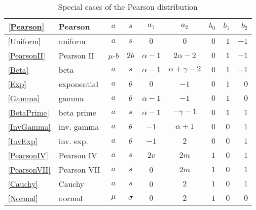 \begin{table*}[tb]
\begin{center}
\caption[Pearson distribution -- Special cases]{Special cases of the Pearson distribution}
\label{PearsonTable2}
{\renewcommand{\arraystretch}{1.25} 
\begin{tabular}{llccccrrr}
\\
\eqref{Pearson}  & Pearson & $a$ & $s$ & $a_1$ & $a_2$  & $b_0$ & $b_1$ & $b_2$ \\
\hline
\eqref{Uniform} 	& uniform 		&  $a$  &  $s$  &  $0$  &  $0$    &     $0$    & $1$ & $-1$  \checked\\
\eqref{PearsonII} 	& Pearson II 	&  $\mu$-$b$  &  $2b$  &  $\alpha-1$  &  $2\alpha-2$    &    $0$   & $1$ &$-1$ \checked\\
\eqref{Beta}     		& {beta} 		&  $a$  &  $s$  &  $\alpha-1$  &  $\alpha+\gamma-2$  &  $0$    &    $1$    &  $-1$  \checked \\
\eqref{Exp} 		& exponential 	&  $a$  &  $\theta$  &  $0$  &  $-1$    &    $0$    & $1$ & $0$ \checked \\
\eqref{Gamma} 	& gamma 		&  $a$  &  $\theta$  &  $\alpha-1$  &  $-1$    &    $0$    & $1$ & $0$ \checked \\
\eqref{BetaPrime} 	& {beta prime} 	&  $a$  &  $s$  &  $\alpha-1$  &  $-\gamma-1$  &  $0$    &    $1$    &  $1$\\
\eqref{InvGamma} 	& inv. gamma 	&  $a$  &  $\theta$  &  $-1$  &  $\alpha+1$  &      $0$    & $0$ & $1$ \checked \\
\eqref{InvExp} 		& inv. exp.&$a$ &  $\theta$  &  $-1$  &  $2$    &     $0$    & $0$ & $1$ \checked \\
\eqref{PearsonIV} 	& {Pearson IV} 	&  $a$  &  $s$  &  $2v$  &  $2m$  &  $1$    &    $0$    & $1$\\
\eqref{PearsonVII} 	& Pearson VII 	&  $a$  &  $s$  &  0  &  $2m$  &  $1$    &    $0$    & $1$ \checked\\
\eqref{Cauchy} 	& Cauchy 		&  $a$  &  $s$  &  0  &  $2$  &    $1$    &    $0$    & $1$  \checked \\
\eqref{Normal} 		& normal 		&$\mu$&  $\sigma$  &  $0$  &  $2$    &    $1$    &    $0$    & $0$ \\
\end{tabular} 
}
\end{center}
\end{table*}

